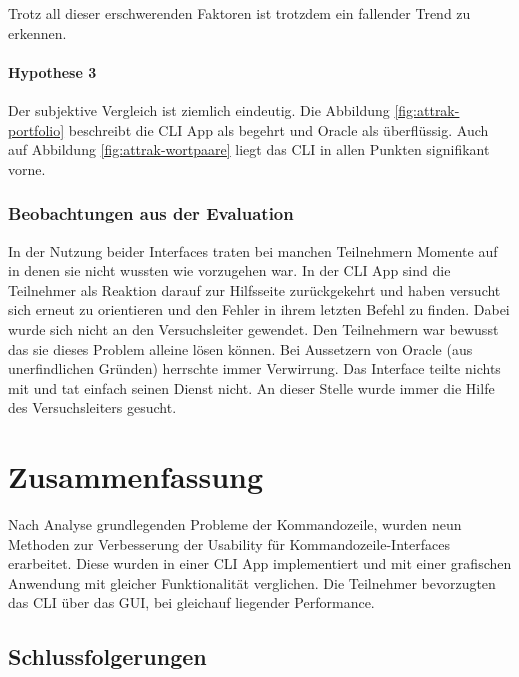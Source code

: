 \documentclass[oneside,bibliography=totocnumbered,BCOR=5mm]{scrbook}
\begin{document}
Trotz all dieser erschwerenden Faktoren ist trotzdem ein fallender Trend zu
erkennen.

\subsubsection{Hypothese 3}

Der subjektive Vergleich ist ziemlich eindeutig. Die Abbildung
\ref{fig:attrak-portfolio} beschreibt die CLI App als begehrt und Oracle als
überflüssig. Auch auf Abbildung \ref{fig:attrak-wortpaare} liegt das CLI in
allen Punkten signifikant vorne.

\subsection{Beobachtungen aus der Evaluation}


In der Nutzung beider Interfaces traten bei manchen Teilnehmern Momente auf in
denen sie nicht wussten wie vorzugehen war. In der CLI App sind die Teilnehmer
als Reaktion darauf zur Hilfsseite zurückgekehrt und haben versucht sich
erneut zu orientieren und den Fehler in ihrem letzten Befehl zu finden. Dabei
wurde sich nicht an den Versuchsleiter gewendet. Den Teilnehmern war bewusst
das sie dieses Problem alleine lösen können. Bei Aussetzern von Oracle (aus
unerfindlichen Gründen) herrschte immer Verwirrung. Das Interface teilte nichts
mit und tat einfach seinen Dienst nicht. An dieser Stelle wurde immer die Hilfe
des Versuchsleiters gesucht.

\chapter{Zusammenfassung}
\label{sec:zusammenfassung}

Nach Analyse grundlegenden Probleme der Kommandozeile, wurden neun Methoden zur
Verbesserung der Usability für Kommandozeile-Interfaces erarbeitet. Diese wurden
in einer CLI App implementiert und mit einer grafischen Anwendung mit gleicher
Funktionalität verglichen. Die Teilnehmer bevorzugten das CLI über das GUI, bei
gleichauf liegender Performance.

\section{Schlussfolgerungen}
\end{document}
